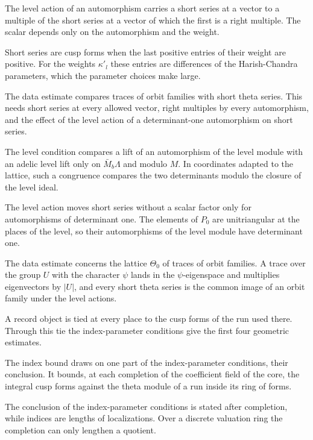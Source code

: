 The level action of an automorphism carries a short series at a vector to a multiple of the short
series at a vector of which the first is a right multiple. The scalar depends only on the
automorphism and the weight.

Short series are cusp forms when the last positive entries of their weight are positive. For the
weights $\kappa'_l$ these entries are differences of the Harish-Chandra parameters, which the parameter
choices make large.

The data estimate compares traces of orbit families with short theta series. This needs short series
at every allowed vector, right multiples by every automorphism, and the effect of the level action of
a determinant-one automorphism on short series.

The level condition compares a lift of an automorphism of the level module with an adelic level lift
only on $\bar M_b\Lambda$ and modulo $M$. In coordinates adapted to the lattice, such a congruence
compares the two determinants modulo the closure of the level ideal.

The level action moves short series without a scalar factor only for automorphisms of determinant
one. The elements of $P_0$ are unitriangular at the places of the level, so their automorphisms of
the level module have determinant one.

The data estimate concerns the lattice $\Theta_0$ of traces of orbit families. A trace over the
group $U$ with the character $\psi$ lands in the $\psi$-eigenspace and multiplies eigenvectors by
$|U|$, and every short theta series is the common image of an orbit family under the level actions.

A record object is tied at every place to the cusp forms of the run used there. Through this tie the
index-parameter conditions give the first four geometric estimates.

The index bound draws on one part of the index-parameter conditions, their conclusion. It bounds,
at each completion of the coefficient field of the core, the integral cusp forms against the theta
module of a run inside its ring of forms.

The conclusion of the index-parameter conditions is stated after completion, while indices are lengths
of localizations. Over a discrete valuation ring the completion can only lengthen a quotient.


